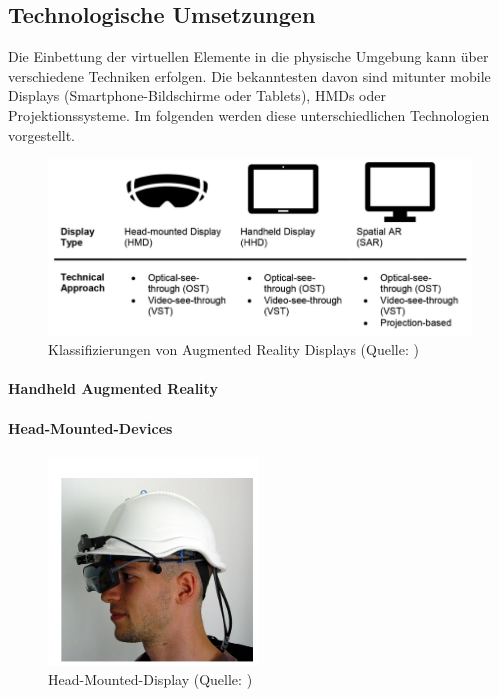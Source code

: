 \subsection{Technologische Umsetzungen}
Die Einbettung der virtuellen Elemente in die physische Umgebung kann über verschiedene Techniken erfolgen. Die bekanntesten davon sind mitunter mobile Displays (Smartphone-Bildschirme oder Tablets), \ac{HMD}s oder Projektionssysteme. Im folgenden werden diese unterschiedlichen Technologien vorgestellt.
\begin{figure}[ht]
\centering
\includegraphics[width=1\linewidth]{content/pictures/devices.PNG}
\caption{Klassifizierungen von Augmented Reality Displays (Quelle: \citealp[S. 315]{leins_comparing_2024})}
\label{fig:ar-classes}
\end{figure}
\paragraph{Handheld Augmented Reality}

\paragraph{Head-Mounted-Devices}
\begin{figure}[ht]
\centering
\includegraphics[width=0.5\linewidth]{content/pictures/hmd-ar.PNG}
\caption{Head-Mounted-Display (Quelle: \citealp[S. 4]{reitmayr_location_2003})}
\label{fig:hmd-ar}
\end{figure}

